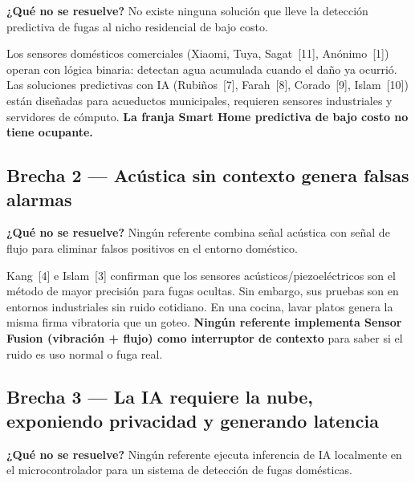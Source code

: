 \documentclass[11pt,a4paper]{article}
\begin{document}
\begin{mdframed}[linecolor=criticalred,linewidth=0.8pt,backgroundcolor=red!3,
  innertopmargin=4pt,innerbottommargin=4pt,innerrightmargin=6pt,innerleftmargin=6pt]
\textbf{¿Qué no se resuelve?} No existe ninguna solución que lleve la detección predictiva
de fugas al nicho residencial de bajo costo.
\end{mdframed}

Los sensores domésticos comerciales (Xiaomi, Tuya, Sagat~[11], Anónimo~[1]) operan con
lógica binaria: detectan agua acumulada cuando el daño ya ocurrió.
Las soluciones predictivas con IA (Rubiños~[7], Farah~[8], Corado~[9], Islam~[10])
están diseñadas para acueductos municipales, requieren sensores industriales y servidores
de cómputo. \textbf{La franja Smart Home predictiva de bajo costo no tiene ocupante.}

\subsection{Brecha 2 — Acústica sin contexto genera falsas alarmas}

\begin{mdframed}[linecolor=warningorange,linewidth=0.8pt,backgroundcolor=orange!3,
  innertopmargin=4pt,innerbottommargin=4pt,innerrightmargin=6pt,innerleftmargin=6pt]
\textbf{¿Qué no se resuelve?} Ningún referente combina señal acústica con señal de
flujo para eliminar falsos positivos en el entorno doméstico.
\end{mdframed}

Kang~[4] e Islam~[3] confirman que los sensores acústicos/piezoeléctricos son el método
de mayor precisión para fugas ocultas. Sin embargo, sus pruebas son en entornos
industriales sin ruido cotidiano. En una cocina, lavar platos genera la misma firma
vibratoria que un goteo. \textbf{Ningún referente implementa Sensor Fusion
(vibración + flujo) como interruptor de contexto} para saber si el ruido es uso normal
o fuga real.

\subsection{Brecha 3 — La IA requiere la nube, exponiendo privacidad y generando latencia}

\begin{mdframed}[linecolor=primaryblue,linewidth=0.8pt,backgroundcolor=blue!3,
  innertopmargin=4pt,innerbottommargin=4pt,innerrightmargin=6pt,innerleftmargin=6pt]
\textbf{¿Qué no se resuelve?} Ningún referente ejecuta inferencia de IA localmente en
el microcontrolador para un sistema de detección de fugas domésticas.
\end{mdframed}
\end{document}
